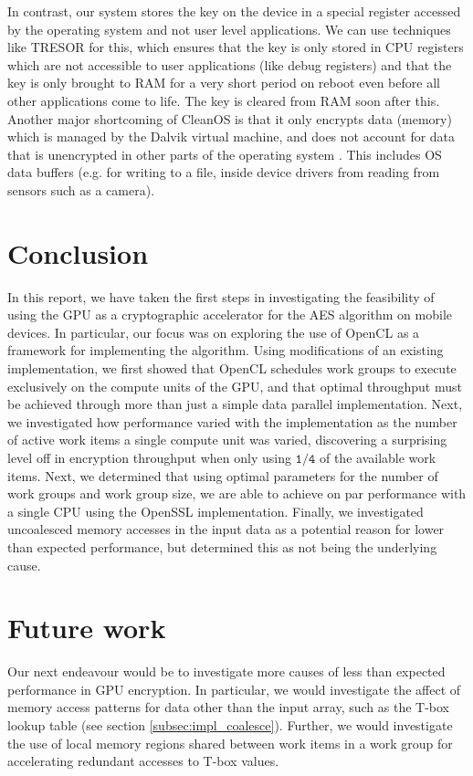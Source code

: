 \documentclass[conference,10pt]{IEEEtran}
\begin{document}
In contrast, our system stores the key on the device in a special register accessed by the operating 
system and not user level applications. We can use techniques like TRESOR \cite{tresor} for this, 
which ensures that the key is only stored in CPU registers which are not accessible to user 
applications (like debug registers) and that the key is only brought to RAM for a very short period 
on reboot even before all other applications come to life. The key is cleared from RAM soon after 
this.  Another major shortcoming of CleanOS is that it only encrypts data (memory) which is managed 
by the Dalvik virtual machine, and does not account for data that is unencrypted in other parts of 
the operating system \cite{cleanos}.  This includes OS data buffers (e.g. for writing to a file, 
inside device drivers from reading from sensors such as a camera).


\section{Conclusion}

In this report, we have taken the first steps in investigating the feasibility of using the GPU as a 
cryptographic accelerator for the AES algorithm on mobile devices.  In particular, our focus was on 
exploring the use of OpenCL as a framework for implementing the algorithm.  Using modifications of 
an existing implementation, we first showed that OpenCL schedules work groups to execute exclusively 
on the compute units of the GPU, and that optimal throughput must be achieved through more than just 
a simple data parallel implementation. Next, we investigated how performance varied with the 
implementation as the number of active work items a single compute unit was varied, discovering a 
surprising level off in encryption throughput when only using $\mathtt{1/4}$ of the available work 
items.  Next, we determined that using optimal parameters for the number of work groups and work 
group size, we are able to achieve on par performance with a single CPU using the OpenSSL 
implementation.  Finally, we investigated uncoalesced memory accesses in the input data as a 
potential reason for lower than expected performance, but determined this as not being the 
underlying cause.  

\section{Future work}

Our next endeavour would be to investigate more causes of less than expected performance in GPU 
encryption.  In particular, we would investigate the affect of memory access patterns for data other 
than the input array, such as the T-box lookup table (see section \ref{subsec:impl_coalesce}).  
Further, we would investigate the use of local memory regions shared between work items in a work 
group for accelerating redundant accesses to T-box values.
\end{document}

